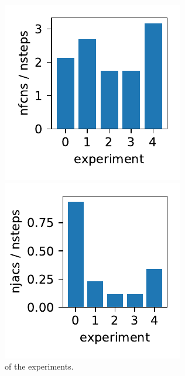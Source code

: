 \documentclass{report}
\begin{document}
\begin{figure}[h]
\centering
\begin{minipage}[t]{0.3\textwidth}
\centering
\includegraphics[width=\textwidth]{../Plots/Project2_main/Figure_710}
\caption{ of the experiments.}
\label{pl:nfcns_nsteps_indx1}
\end{minipage}
\hfill
\begin{minipage}[t]{0.3\textwidth}
\centering
\includegraphics[width=\textwidth]{../Plots/Project2_main/Figure_711}

\end{minipage}
\end{figure}
\end{document}
